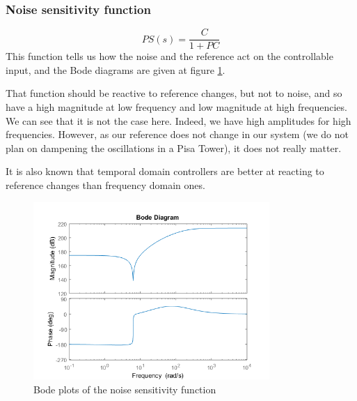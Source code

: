 \subsubsection{Noise sensitivity function}
$$
PS(s) = \dfrac{C}{1 + PC}
$$
This function tells us how the noise and the reference act on the controllable input, and the Bode diagrams are given at figure \ref{fig:noise-sensitivity}.\par
That function should be reactive to reference changes, but not to noise, and so have a high magnitude at low frequency and low magnitude at high frequencies. We can see that it is not the case here. Indeed, we have high amplitudes for high frequencies. However, as our reference does not change in our system (we do not plan on dampening the oscillations in a Pisa Tower), it does not really matter.\par
It is also known that temporal domain controllers are better at reacting to reference changes than frequency domain ones.
\begin{figure}[H]
    \centering
    \includegraphics[width=0.8\textwidth]{resources/png/noise-sensitivity.png}
    \caption{Bode plots of the noise sensitivity function}
    \label{fig:noise-sensitivity}
\end{figure}
